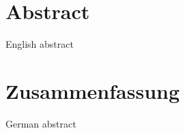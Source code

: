 \section*{Abstract}
English abstract

\clearpage



\section*{Zusammenfassung}
German abstract
\clearpage


